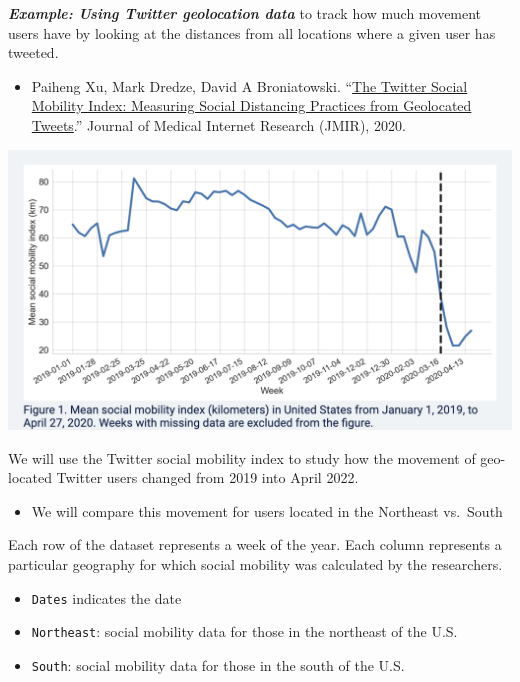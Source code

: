 \documentclass[
  letterpaper,
  DIV=11,
  numbers=noendperiod]{scrreprt}
\providecommand{\tightlist}{%
  \setlength{\itemsep}{0pt}\setlength{\parskip}{0pt}}\usepackage{longtable,booktabs,array}
\begin{document}
\textbf{\emph{Example: Using Twitter geolocation data}} to track how
much movement users have by looking at the distances from all locations
where a given user has tweeted.

\begin{itemize}
\tightlist
\item
  Paiheng Xu, Mark Dredze, David A Broniatowski.
  ``\href{https://socialmobility.covid19dataresources.org/}{The Twitter
  Social Mobility Index: Measuring Social Distancing Practices from
  Geolocated Tweets}.'' Journal of Medical Internet Research (JMIR),
  2020.
\end{itemize}

\includegraphics{images/covidtwitter.png}

We will use the Twitter social mobility index to study how the movement
of geo-located Twitter users changed from 2019 into April 2022.

\begin{itemize}
\tightlist
\item
  We will compare this movement for users located in the Northeast
  vs.~South
\end{itemize}

Each row of the dataset represents a week of the year. Each column
represents a particular geography for which social mobility was
calculated by the researchers.

\begin{itemize}
\tightlist
\item
  \texttt{Dates} indicates the date
\item
  \texttt{Northeast}: social mobility data for those in the northeast of
  the U.S.
\item
  \texttt{South}: social mobility data for those in the south of the
  U.S.
\end{itemize}
\end{document}
